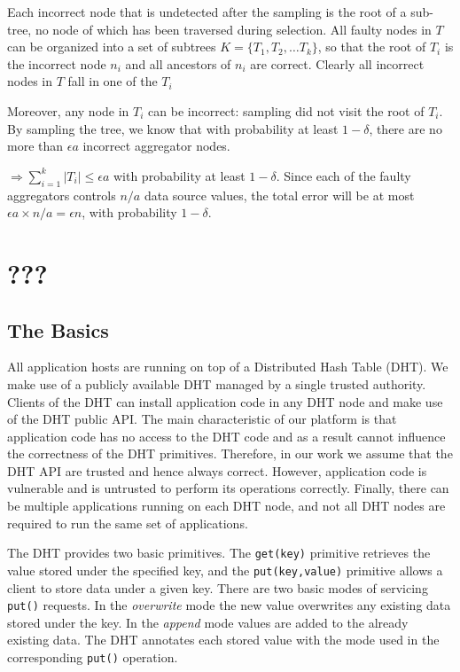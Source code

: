 \documentclass{article}
\newenvironment{proof}[1][Proof]{\begin{trivlist}
\item[\hskip \labelsep {\bfseries #1}]}{\end{trivlist}}
\begin{document}
\begin{proof}
Each incorrect node that is undetected after the sampling is the root
of a sub-tree, no node of which has been traversed during
selection. All faulty nodes in $T$ can be organized into a set of
subtrees $K = \{T_1, T_2,\ldots T_k\}$, so that the root of $T_i$ is
the incorrect node $n_i$ and all ancestors of $n_i$ are correct. Clearly all incorrect
nodes in $T$ fall in one of the $T_i$


Moreover, any node in $T_i$
can be incorrect: sampling did not visit the root of $T_i$. By
sampling the tree, we know that with probability at least $1-\delta$,
there are no more than $\epsilon a$ incorrect aggregator nodes.

$\Rightarrow \sum_{i=1}^{k}|T_i| \leq \epsilon a$ with probability at
least $1-\delta$. Since each of the
faulty aggregators controls $n/a$ data source values, the total error
will be at most $\epsilon a \times n/a = \epsilon n$, with probability
$1-\delta$.
\end{proof}

\section{???}

\subsection{The Basics}
All application hosts are running on top of a Distributed Hash Table
(DHT). We make use of a publicly available DHT managed by a single
trusted authority. Clients of the DHT can install application code
in any DHT node and make use of the DHT public API. The main
characteristic of our platform is that application code has no access to
the DHT code and as a result cannot influence the correctness of the
DHT primitives. Therefore, in our work we assume that the DHT API are
trusted and hence always correct. However, application code is
vulnerable and is untrusted to perform its operations
correctly. Finally, there can be multiple applications running on
each DHT node, and not all DHT nodes are required to run the
same set of applications.

The DHT provides two basic primitives. The {\tt get(key)} primitive
retrieves the value stored under the specified key, and the
{\tt put(key,value)} primitive allows a client to store data under a
given key. There are two basic modes of servicing {\tt put()}
requests. In the \emph{overwrite} mode the new value overwrites any 
existing data stored under the key. In the \emph{append} mode values
are added to the already existing data. The DHT annotates each
stored value with the mode used in the corresponding {\tt put()}
operation.
\end{document}
